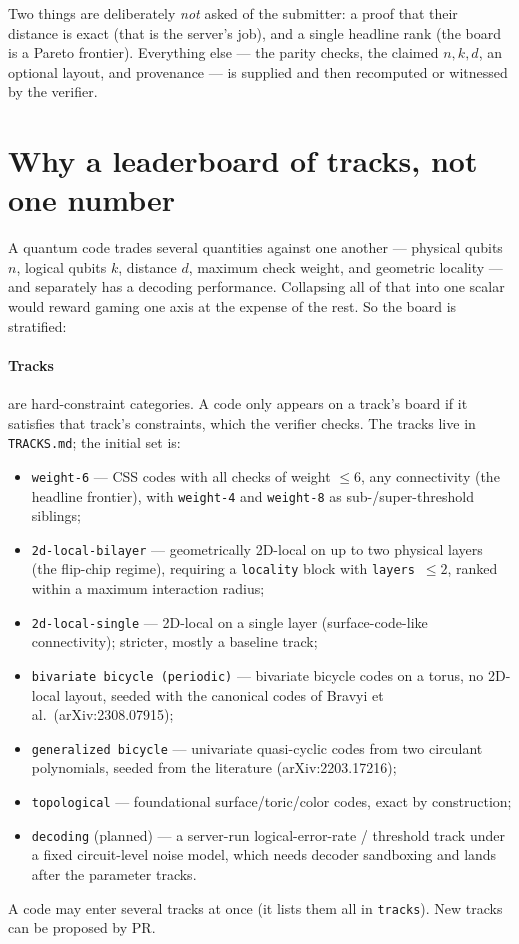 \documentclass[11pt]{article}
\begin{document}
	Two things are deliberately \emph{not} asked of the submitter: a proof that
	their distance is exact (that is the server's job), and a single headline
	rank (the board is a Pareto frontier). Everything else --- the parity
	checks, the claimed $n,k,d$, an optional layout, and provenance --- is
	supplied and then recomputed or witnessed by the verifier.

	\section{Why a leaderboard of tracks, not one number}

	A quantum code trades several quantities against one another --- physical
	qubits $n$, logical qubits $k$, distance $d$, maximum check weight, and
	geometric locality --- and separately has a decoding performance. Collapsing
	all of that into one scalar would reward gaming one axis at the expense of
	the rest. So the board is stratified:

	\paragraph{Tracks} are hard-constraint categories. A code only appears on a
	track's board if it satisfies that track's constraints, which the verifier
	checks. The tracks live in \texttt{TRACKS.md}; the initial set is:
	\begin{itemize}[nosep]
		\item \texttt{weight-6} --- CSS codes with all checks of weight
		$\le 6$, any connectivity (the headline frontier), with
		\texttt{weight-4} and \texttt{weight-8} as sub-/super-threshold
		siblings;
		\item \texttt{2d-local-bilayer} --- geometrically 2D-local on up to two
		physical layers (the flip-chip regime), requiring a \texttt{locality}
		block with \texttt{layers}~$\le 2$, ranked within a maximum interaction
		radius;
		\item \texttt{2d-local-single} --- 2D-local on a single layer
		(surface-code-like connectivity); stricter, mostly a baseline track;
		\item \texttt{bivariate bicycle (periodic)} --- bivariate bicycle codes
		on a torus, no 2D-local layout, seeded with the canonical codes of
		Bravyi et al.\ (arXiv:2308.07915);
		\item \texttt{generalized bicycle} --- univariate quasi-cyclic codes
		from two circulant polynomials, seeded from the literature
		(arXiv:2203.17216);
		\item \texttt{topological} --- foundational surface/toric/color codes,
		exact by construction;
		\item \texttt{decoding} (planned) --- a server-run logical-error-rate /
		threshold track under a fixed circuit-level noise model, which needs
		decoder sandboxing and lands after the parameter tracks.
	\end{itemize}
	A code may enter several tracks at once (it lists them all in
	\texttt{tracks}). New tracks can be proposed by PR.
\end{document}
